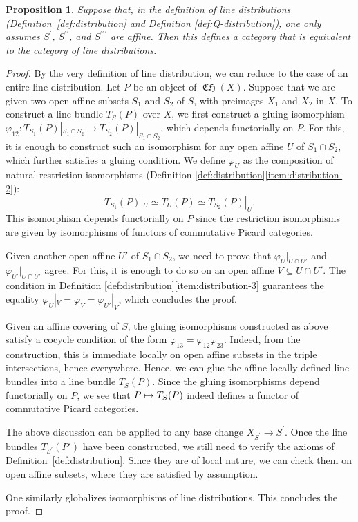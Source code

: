 \documentclass[JEP,XML,SOM,Unicode,published]{cedram}
\newcommand\mto{\mathchoice{\longmapsto}{\mapsto}{\mapsto}{\mapsto}}
\theoremstyle{plain}
\newtheorem{proposition}[theorem]{Proposition}
\theoremstyle{definition}
\DeclareMathOperator{\CHfrak}{\mathfrak{CH}}
\begin{document}
\begin{proposition}\label{prop:line-distribution-affine}
Suppose that, in the definition of line distributions (\cf Defini\-tion~\ref{def:distribution} and Definition \ref{def:Q-distribution}), one only assumes $S^{\prime}$, $S^{\prime\prime}$, and $S^{\prime\prime\prime}$ are affine. Then this defines a category that is equivalent to the category of line distributions.
\end{proposition}

\begin{proof}
By the very definition of line distribution, we can reduce to the case of an entire line distribution. Let $P$ be an object of $\CHfrak(X)$. Suppose that we are given two open affine subsets $S_1$ and $S_2$ of $S$, with preimages $X_{1}$ and $X_{2}$ in $X$. To construct a line bundle $T_{S}(P)$ over $X$, we first construct a gluing isomorphism $\varphi_{12}: T_{S_{1}}(P)|_{S_{1}\cap S_{2}} \to T_{S_2}(P)|_{S_{1}\cap S_{2}}$, which depends functorially on $P$. For this, it is enough to construct such an isomorphism for any open affine $U$ of $S_{1} \cap S_{2}$, which further satisfies a gluing condition. We define $\varphi_U$ as the composition of natural restriction isomorphisms (\cf Definition \ref{def:distribution}\eqref{item:distribution-2}):\vspace*{-3pt}
\begin{displaymath}
T_{S_1}(P)|_U \simeq T_{U}(P) \simeq T_{S_2}(P)|_U.
\end{displaymath}
This isomorphism depends functorially on $P$ since the restriction isomorphisms are given by isomorphisms of functors of commutative Picard categories.

Given another open affine $U'$ of $S_{1} \cap S_{2}$, we need to prove that $\varphi_{U}|_{U \cap U'}$ and $\varphi_{U'}|_{U \cap U'}$ agree. For this, it is enough to do so on an open affine $V \subseteq U \cap U'$. The condition in Definition \ref{def:distribution}\eqref{item:distribution-3} guarantees the equality $\varphi_U|_V = \varphi_V = \varphi_{U'}|_V$, which concludes the proof.

Given an affine covering of $S$, the gluing isomorphisms constructed as above satisfy a cocycle condition of the form $\varphi_{13} = \varphi_{12} \varphi_{23}$. Indeed, from the construction, this is immediate locally on open affine subsets in the triple intersections, hence everywhere. Hence, we can glue the affine locally defined line bundles into a line bundle $T_{S}(P)$. Since the gluing isomorphisms depend functorially on $P$, we see that $P\mto T_{S}(P)$ indeed defines a functor of commutative Picard categories.

The above discussion can be applied to any base change $X_{S^{\prime}}\to S^{\prime}$. Once the line bundles $T_{S^{\prime}}(P')$ have been constructed, we still need to verify the axioms of Definition~\ref{def:distribution}. Since they are of local nature, we can check them on open affine subsets, where they are satisfied by assumption.

One similarly globalizes isomorphisms of line distributions. This concludes the proof.
\end{proof}
\end{document}

